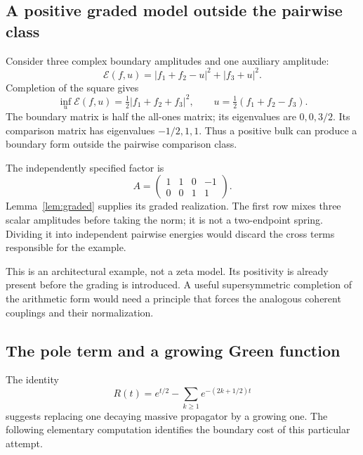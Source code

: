 \documentclass[11pt]{article}
\numberwithin{equation}{section}
\theoremstyle{definition}
\theoremstyle{remark}
\newcommand{\EE}{\mathcal E}
\begin{document}
\subsection{A positive graded model outside the pairwise class}

Consider three complex boundary amplitudes and one auxiliary amplitude:
\begin{equation}
\EE(f,u)=|f_1+f_2-u|^2+|f_3+u|^2.
\label{eq:coherent}
\end{equation}
Completion of the square gives
\begin{equation}
\inf_u\EE(f,u)=\tfrac12|f_1+f_2+f_3|^2,
\qquad u=\tfrac12(f_1+f_2-f_3).
\end{equation}
The boundary matrix is half the all-ones matrix; its eigenvalues are
$0,0,3/2$. Its comparison matrix has eigenvalues $-1/2,1,1$.
Thus a positive bulk can produce a boundary form outside the pairwise
comparison class.

The independently specified factor is
\begin{equation}
A=\begin{pmatrix}1&1&0&-1\\0&0&1&1\end{pmatrix}.
\end{equation}
Lemma~\ref{lem:graded} supplies its graded realization. The first row
mixes three scalar amplitudes before taking the norm; it is not a
two-endpoint spring. Dividing it into independent pairwise energies would
discard the cross terms responsible for the example.

This is an architectural example, not a zeta model. Its positivity is
already present before the grading is introduced. A useful supersymmetric
completion of the arithmetic form would need a principle that forces
the analogous coherent couplings and their normalization.

\subsection{The pole term and a growing Green function}

The identity
\begin{equation}
R(t)=e^{t/2}-\sum_{k\geq1}e^{-(2k+1/2)t}
\label{eq:Rsplit}
\end{equation}
suggests replacing one decaying massive propagator by a growing one.
The following elementary computation identifies the boundary cost of
this particular attempt.
\end{document}
